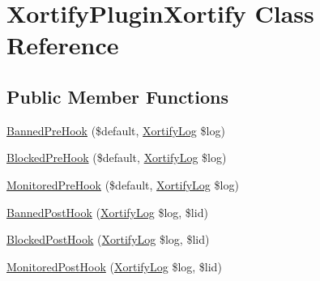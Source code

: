 \hypertarget{class_xortify_plugin_xortify}{\section{Xortify\-Plugin\-Xortify Class Reference}
\label{class_xortify_plugin_xortify}
}
\subsection*{Public Member Functions}
\begin{DoxyCompactItemize}
\item 
\hyperlink{class_xortify_plugin_xortify_aacd0a27d3740aae83c03e921f6e58783}{Banned\-Pre\-Hook} (\$default, \hyperlink{class_xortify_log}{Xortify\-Log} \$log)
\item 
\hyperlink{class_xortify_plugin_xortify_a1b0001df5cf5ef18a5181774ce16b089}{Blocked\-Pre\-Hook} (\$default, \hyperlink{class_xortify_log}{Xortify\-Log} \$log)
\item 
\hyperlink{class_xortify_plugin_xortify_abbd4e782a10042ec86d3bef94daad89a}{Monitored\-Pre\-Hook} (\$default, \hyperlink{class_xortify_log}{Xortify\-Log} \$log)
\item 
\hyperlink{class_xortify_plugin_xortify_a6bc03033f17c2fcede4d020d1cfbcc48}{Banned\-Post\-Hook} (\hyperlink{class_xortify_log}{Xortify\-Log} \$log, \$lid)
\item 
\hyperlink{class_xortify_plugin_xortify_a1cb2408e6422326482b2e8eb45d2d0c1}{Blocked\-Post\-Hook} (\hyperlink{class_xortify_log}{Xortify\-Log} \$log, \$lid)
\item 
\hyperlink{class_xortify_plugin_xortify_aa4a3d909c3769e0c3c7b6488f8659a1d}{Monitored\-Post\-Hook} (\hyperlink{class_xortify_log}{Xortify\-Log} \$log, \$lid)
\end{DoxyCompactItemize}


